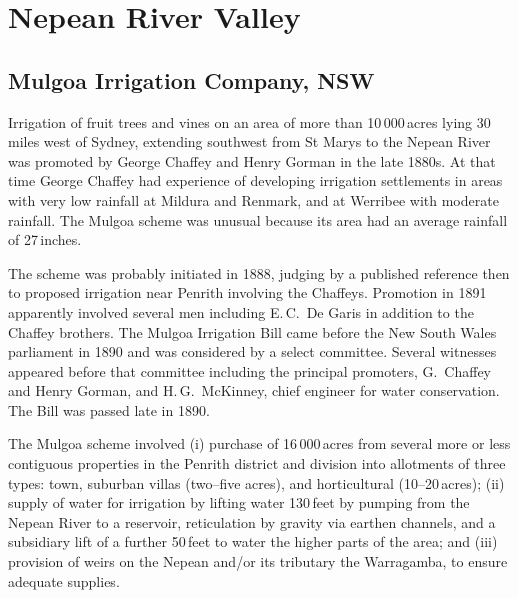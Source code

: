 \section*{Nepean River Valley}

\subsection*{Mulgoa Irrigation Company, NSW}

Irrigation of fruit trees and vines on an area of more than
10\,000\,acres lying 30 miles west of Sydney, extending southwest from
St Marys to the Nepean River was promoted by George Chaffey
 and Henry
Gorman  in the late 1880s.  At that time George
Chaffey had experience of developing irrigation settlements in areas
with very low rainfall at Mildura and Renmark, and at Werribee with
moderate rainfall.  The Mulgoa scheme was unusual because its area had
an average rainfall of 27\,inches.

The scheme was probably initiated in 1888, judging by a published
reference then to proposed irrigation near Penrith involving the
Chaffeys.  Promotion in 1891 apparently involved several men including
E.\,C.~De Garis in addition to the Chaffey brothers.  The Mulgoa
Irrigation Bill came before the New South Wales parliament in 1890 and
was considered by a select committee.  Several witnesses appeared
before that committee including the principal promoters, G.~Chaffey
and Henry Gorman, and H.\,G.~McKinney,  chief
engineer for water conservation.  The  Bill was passed late in 1890.

The Mulgoa scheme involved (i) purchase of 16\,000\,acres from several
more or less contiguous properties in the Penrith district and
division into allotments of three types: town, suburban villas
(two--five acres), and horticultural (10--20\,acres); (ii) supply of
water for irrigation by lifting water 130\,feet by pumping from the
Nepean River to a reservoir, reticulation by gravity via earthen
channels, and a subsidiary lift of a further 50\,feet to water the
higher parts of the area; and (iii) provision of weirs on the Nepean
and/or its tributary the Warragamba,  to
ensure adequate supplies.

